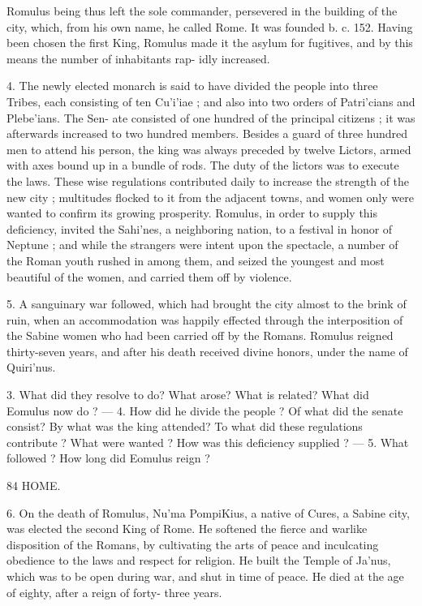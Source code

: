 \documentclass[openany,a4paper]{memoir}
\begin{document}
{Romulus being thus left the sole commander, persevered 
in the building of the city, which, from his own name, he 
called Rome. It was founded b. c. 152. Having been 
chosen the first King, Romulus made it the asylum for 
fugitives, and by this means the number of inhabitants rap- 
idly increased. 

4. The newly elected monarch is said to have divided the 
people into three Tribes, each consisting of ten Cu'i'iae ; and 
also into two orders of Patri'cians and Plebe'ians. The Sen- 
ate consisted of one hundred of the principal citizens ; it was 
afterwards increased to two hundred members. Besides a 
guard of three hundred men to attend his person, the king was 
always preceded by twelve Lictors, armed with axes bound up 
in a bundle of rods. The duty of the lictors was to execute the 
laws. These wise regulations contributed daily to increase 
the strength of the new city ; multitudes flocked to it from 
the adjacent towns, and women only were wanted to confirm 
its growing prosperity. Romulus, in order to supply this 
deficiency, invited the Sahi'nes, a neighboring nation, to a 
festival in honor of Neptune ; and while the strangers were 
intent upon the spectacle, a number of the Roman youth 
rushed in among them, and seized the youngest and most 
beautiful of the women, and carried them off by violence. 

5. A sanguinary war followed, which had brought the 
city almost to the brink of ruin, when an accommodation 
was happily effected through the interposition of the Sabine 
women who had been carried off by the Romans. Romulus 
reigned thirty-seven years, and after his death received divine 
honors, under the name of Quiri'nus. 

3. What did they resolve to do? What arose? What is related? 
What did Eomulus now do ? — 4. How did he divide the people ? Of 
what did the senate consist? By what was the king attended? To 
what did these regulations contribute ? What were wanted ? How was 
this deficiency supplied ? — 5. What followed ? How long did Eomulus 
reign ? 



84 HOME. 

6. On the death of Romulus, Nu'ma PompiKius, a native 
of Cures, a Sabine city, was elected the second King of Rome. 
He softened the fierce and warlike disposition of the Romans, 
by cultivating the arts of peace and inculcating obedience 
to the laws and respect for religion. He built the Temple of 
Ja'nus, which was to be open during war, and shut in time 
of peace. He died at the age of eighty, after a reign of forty- 
three years. 

}
\end{document}
